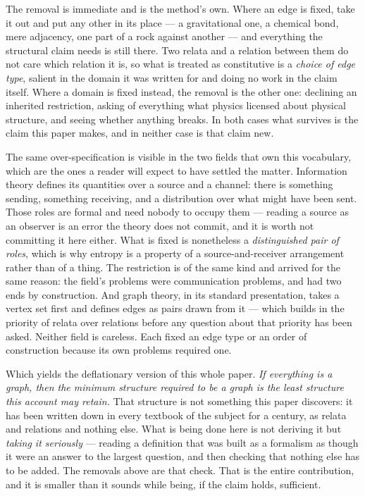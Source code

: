 \documentclass[11pt,a4paper]{article}
\theoremstyle{remark}\newtheorem{remark}[proposition]{Remark}
\begin{document}
The removal is immediate and is the method's own. Where an edge is fixed, take it out and put any
other in its place --- a gravitational one, a chemical bond, mere adjacency, one part of a rock against
another --- and everything the structural claim needs is still there. Two relata and a relation between
them do not care which relation it is, so what is treated as constitutive is a \emph{choice of edge
type}, salient in the domain it was written for and doing no work in the claim itself. Where a domain
is fixed instead, the removal is the other one: declining an inherited restriction, asking of
everything what physics licensed about physical structure, and seeing whether anything breaks. In both
cases what survives is the claim this paper makes, and in neither case is that claim new.

The same over-specification is visible in the two fields that own this vocabulary, which are the ones a
reader will expect to have settled the matter. Information theory defines
its quantities over a source and a channel: there is something sending, something receiving, and a
distribution over what might have been sent. Those roles are formal and need nobody to occupy them --- reading a source as an
observer is an error the theory does not commit, and it is worth not committing it here either. What is
fixed is nonetheless a \emph{distinguished pair of roles}, which is why entropy is a property of a
source-and-receiver arrangement rather than of a thing. The restriction is of the same kind and arrived
for the same reason: the field's problems were communication problems, and had two ends by
construction. And
graph theory, in its standard presentation, takes a vertex set first and defines edges as pairs drawn
from it --- which builds in the priority of relata over relations before any question about that
priority has been asked. Neither field is careless. Each fixed an edge type or an order of construction
because its own problems required one.

Which yields the deflationary version of this whole paper. \emph{If everything is a graph, then the
minimum structure required to be a graph is the least structure this account may retain.} That structure
is not something this paper discovers: it has been written down in every textbook of the subject for a
century, as relata and relations and nothing else. What is being done here is not deriving it but
\emph{taking it seriously} --- reading a definition that was built as a formalism as though it were an
answer to the largest question, and then checking that nothing else has to be added. The removals above
are that check. That is the entire contribution, and it is smaller than it sounds while being, if the
claim holds, sufficient.
\end{document}
